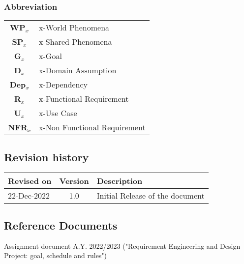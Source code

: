 \subsubsection{Abbreviation}
\begin{table}[H]
    \begin{tabularx}{\textwidth}{cX}
        \toprule
        \textbf{WP$_x$}  & x-World Phenomena            \\
        \textbf{SP$_x$}  & x-Shared Phenomena           \\
        \textbf{G$_x$}   & x-Goal                       \\
        \textbf{D$_x$}   & x-Domain Assumption          \\
        \textbf{Dep$_x$} & x-Dependency                 \\
        \textbf{R$_x$}   & x-Functional Requirement     \\
        \textbf{U$_x$}   & x-Use Case                   \\
        \textbf{NFR$_x$} & x-Non Functional Requirement \\
        \bottomrule
    \end{tabularx}
\end{table}

\subsection{Revision history}
\begin{table}[H]
    \begin{tabularx}{\textwidth}{lcl}
        \toprule
        \textbf{Revised on} & Version & Description                     \\ \midrule
        22-Dec-2022         & 1.0     & Initial Release of the document \\
        \bottomrule
    \end{tabularx}
\end{table}


\subsection{Reference Documents}
Assignment document A.Y. 2022/2023 ("Requirement Engineering and Design Project: goal, schedule and rules")


